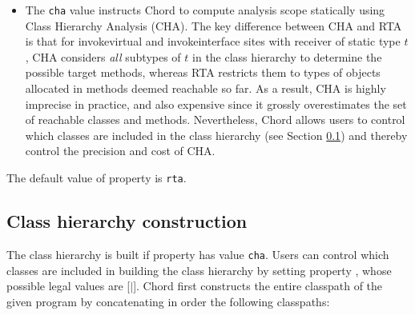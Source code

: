 \begin{itemize}
\item
The {\tt cha} value instructs Chord to compute analysis scope
statically using Class Hierarchy Analysis (CHA).
The key difference between CHA and RTA is that for invokevirtual and
invokeinterface sites with receiver of static type $t$, CHA considers
{\it all} subtypes of $t$ in the class hierarchy to determine the
possible target methods, whereas RTA restricts them to types of
objects allocated in methods deemed reachable so far.  As a result,
CHA is highly imprecise in practice, and also expensive since it
grossly overestimates the set of reachable classes and methods.
Nevertheless, Chord allows users to control which classes are
included in the class hierarchy (see Section \ref{sec:cha}) and thereby control the
precision and cost of CHA.

\end{itemize}
The default value of property  is {\tt rta}.

\subsection{Class hierarchy construction}
\label{sec:cha}

The class hierarchy is built if property  has
value {\tt cha}.  Users can control which classes are included in
building the class hierarchy by setting property ,
whose possible legal values are [$|$].
Chord first constructs the entire classpath of the given program by
concatenating in order the following classpaths:

